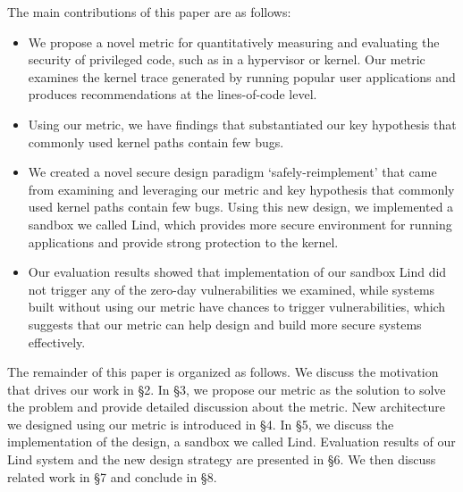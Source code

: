 The main contributions of this paper are as follows:

\begin{itemize}
\item We propose a novel metric for quantitatively measuring and evaluating 
the security of privileged code, such as in a hypervisor or kernel. 
Our metric examines the kernel trace generated by running popular user 
applications and produces recommendations at the lines-of-code level.  

\item Using our metric, we have findings that substantiated our key hypothesis that commonly used kernel paths 
contain few bugs.  

\item We created a novel secure design paradigm `safely-reimplement' that 
came from examining and leveraging our metric and key hypothesis 
that commonly used kernel paths contain few bugs.  
Using this new design, we implemented a sandbox we called Lind, which provides more secure environment
for running applications and provide strong protection to the kernel. 

\item Our evaluation results showed that implementation of our sandbox Lind did not trigger any of the 
zero-day vulnerabilities we examined, 
while systems built without using our metric have chances to trigger
vulnerabilities, which suggests 
that our metric can help design and build more secure systems effectively.
\end{itemize}

The remainder of this paper is organized as follows. 
We discuss the motivation that drives our work in \S{2}. 
In \S{3}, we propose our metric as the solution to solve the problem and provide detailed discussion about the metric.
New architecture we designed using our metric is introduced in \S{4}. In \S{5}, we discuss the implementation of the design, a sandbox we called Lind. 
Evaluation results of our Lind system and the new design strategy are presented in \S{6}. 
We then discuss related work in \S{7} and conclude in \S{8}. 
